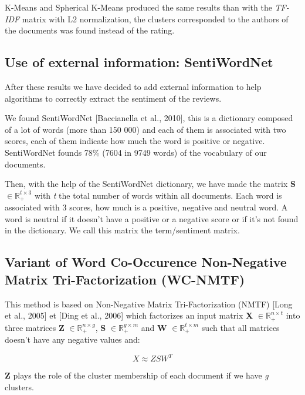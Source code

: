 \documentclass{article}
\begin{document}
K-Means and Spherical K-Means produced the same results than with the \textit{TF-IDF} matrix with L2 normalization, the clusters corresponded to the authors of the documents was found instead of the rating.



\subsection{Use of external information: SentiWordNet}
After these results we have decided to add external information to help algorithms to correctly extract the sentiment of the reviews.

We found SentiWordNet [Baccianella et al., 2010], this is a dictionary composed of a lot of words (more than 150 000) and each of them is associated with two scores, each of them indicate how much the word is positive or negative. SentiWordNet founds 78\% (7604 in 9749 words) of the vocabulary of our documents.

Then, with the help of the SentiWordNet dictionary, we have made the matrix \textbf{S} $\in \mathbb{R}^{t \times 3}_{+}$ with \textit{t} the total number of words within all documents. Each word is associated with 3 scores, how much is a positive, negative and neutral word. A word is neutral if it doesn't have a positive or a negative score or if it's not found in the dictionary. We call this matrix the term/sentiment matrix.



\subsection{Variant of Word Co-Occurence Non-Negative Matrix Tri-Factorization (WC-NMTF)}

This method is based on Non-Negative Matrix Tri-Factorization (NMTF) [Long et al., 2005] et [Ding et al., 2006] which factorizes an input matrix \textbf{X} $\in \mathbb{R}^{n \times t}_{+}$ into three matrices \textbf{Z} $\in \mathbb{R}^{n \times g}_{+}$, \textbf{S} $\in \mathbb{R}^{g \times m}_{+}$ and \textbf{W} $\in \mathbb{R}^{t \times m}_{+}$ such that all matrices doesn't have any negative values and:

\begin{equation}
X \approx ZSW^{T}
\label{eq:nmf}
\end{equation}

\textbf{Z} plays the role of the cluster membership of each document if we have \textit{g} clusters. 
\end{document}
